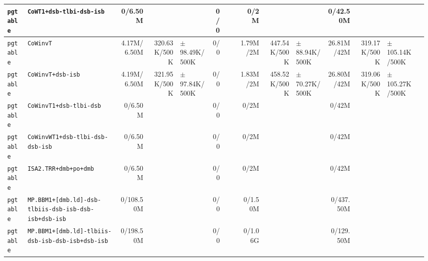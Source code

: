 \begin{tabular}{l l  | r r l | r r l | r r l | r r l l}
        \verb|pgtable| &                               \verb|CoWT1+dsb-tlbi-dsb-isb| &        0/6.50M &                       &                   &            0/0 &                       &  &           0/2M &                       &                   &       0/42.50M &                       &                    & \\ \hline 
        \verb|pgtable| &                                              \verb|CoWinvT| &    4.17M/6.50M &          320.63K/500K & $\pm$ 98.49K/500K &            0/0 &                       &  &       1.79M/2M &          447.54K/500K & $\pm$ 88.94K/500K &     26.81M/42M &          319.17K/500K & $\pm$ 105.14K/500K & \\ \hline 
        \verb|pgtable| &                                      \verb|CoWinvT+dsb-isb| &    4.19M/6.50M &          321.95K/500K & $\pm$ 97.84K/500K &            0/0 &                       &  &       1.83M/2M &          458.52K/500K & $\pm$ 70.27K/500K &     26.80M/42M &          319.06K/500K & $\pm$ 105.27K/500K & \\ \hline 
        \verb|pgtable| &                                \verb|CoWinvT1+dsb-tlbi-dsb| &        0/6.50M &                       &                   &            0/0 &                       &  &           0/2M &                       &                   &          0/42M &                       &                    & \\ \hline 
        \verb|pgtable| &                       \verb|CoWinvWT1+dsb-tlbi-dsb-dsb-isb| &        0/6.50M &                       &                   &            0/0 &                       &  &           0/2M &                       &                   &          0/42M &                       &                    & \\ \hline 
        \verb|pgtable| &                                  \verb|ISA2.TRR+dmb+po+dmb| &        0/6.50M &                       &                   &            0/0 &                       &  &           0/2M &                       &                   &          0/42M &                       &                    & \\ \hline 
        \verb|pgtable| &  \verb|MP.BBM1+[dmb.ld]-dsb-tlbiis-dsb-isb-dsb-isb+dsb-isb| &      0/108.50M &                       &                   &            0/0 &                       &  &        0/1.50M &                       &                   &      0/437.50M &                       &                    & \\ \hline 
        \verb|pgtable| &      \verb|MP.BBM1+[dmb.ld]-tlbiis-dsb-isb-dsb-isb+dsb-isb| &      0/198.50M &                       &                   &            0/0 &                       &  &        0/1.06G &                       &                   &      0/129.50M &                       &                    & \\ \hline 

\end{tabular}
